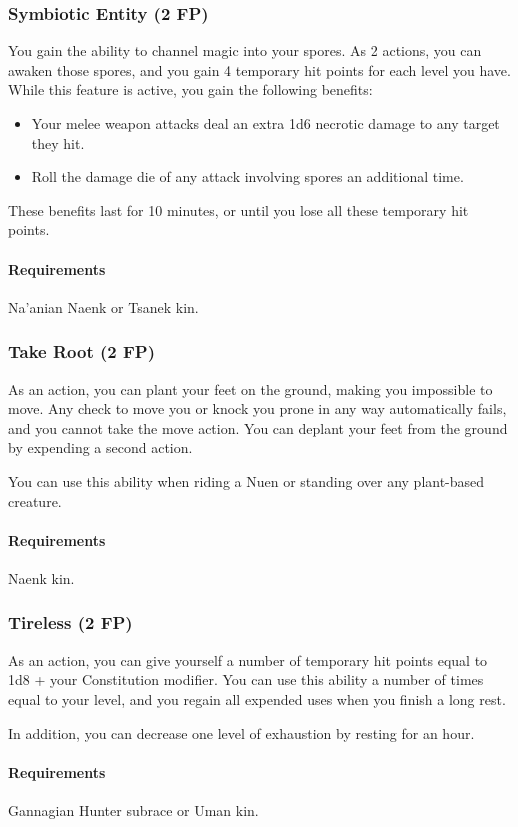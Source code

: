     \subsubsection{Symbiotic Entity (2 FP)} \label{feat::symbioticentity}
        You gain the ability to channel magic into your spores.
        As 2 actions, you can awaken those spores, and you gain 4 temporary hit points for each level you have.
        While this feature is active, you gain the following benefits:
        \begin{itemize}
            \item Your melee weapon attacks deal an extra 1d6 necrotic damage to any target they hit.
            \item Roll the damage die of any attack involving spores an additional time.
        \end{itemize}
        These benefits last for 10 minutes, or until you lose all these temporary hit points.
        \paragraph{Requirements} Na'anian Naenk or Tsanek kin.
    \subsubsection{Take Root (2 FP)} \label{feat::takeroot}
        As an action, you can plant your feet on the ground, making you impossible to move.
        Any check to move you or knock you prone in any way automatically fails, and you cannot take the move action.
        You can deplant your feet from the ground by expending a second action.

        You can use this ability when riding a Nuen or standing over any plant-based creature.
        \paragraph{Requirements} Naenk kin.
    \subsubsection{Tireless (2 FP)} \label{feat::tireless}
        As an action, you can give yourself a number of temporary hit points equal to 1d8 + your Constitution modifier.
        You can use this ability a number of times equal to your level, and you regain all expended uses when you finish a long rest.

        In addition, you can decrease one level of exhaustion by resting for an hour.
        \paragraph{Requirements} Gannagian Hunter subrace or Uman kin.

\newpage~\newpage
